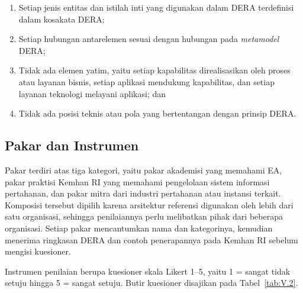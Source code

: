 \begin{enumerate}[label=K\arabic*., leftmargin=*]
\item Setiap jenis entitas dan istilah inti yang digunakan dalam DERA terdefinisi dalam kosakata DERA;
\item Setiap hubungan antarelemen sesuai dengan hubungan pada \textit{metamodel} DERA;
\item Tidak ada elemen yatim, yaitu setiap kapabilitas direalisasikan oleh proses atau layanan bisnis, setiap aplikasi mendukung kapabilitas, dan setiap layanan teknologi melayani aplikasi; dan
\item Tidak ada posisi teknis atau pola yang bertentangan dengan prinsip DERA.
\end{enumerate}

\subsection{Pakar dan Instrumen}
\label{sec:V.1.2}

Pakar terdiri atas tiga kategori, yaitu pakar akademisi yang memahami EA, pakar praktisi Kemhan RI yang memahami pengelolaan sistem informasi pertahanan, dan pakar mitra dari industri pertahanan atau instansi terkait. Komposisi tersebut dipilih karena arsitektur referensi digunakan oleh lebih dari satu organisasi, sehingga penilaiannya perlu melibatkan pihak dari beberapa organisasi. Setiap pakar mencantumkan nama dan kategorinya, kemudian menerima ringkasan DERA dan contoh penerapannya pada Kemhan RI sebelum mengisi kuesioner.

Instrumen penilaian berupa kuesioner skala Likert 1–5, yaitu 1 = sangat tidak setuju hingga 5 = sangat setuju. Butir kuesioner disajikan pada Tabel~\ref{tab:V.2}.

